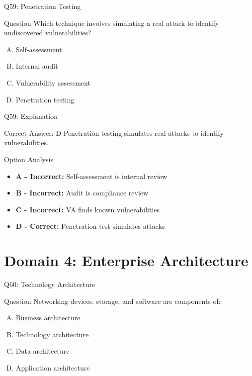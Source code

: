 \documentclass{beamer}
\begin{document}
	\begin{frame}{Q59: Penetration Testing}
		\begin{block}{Question}
			Which technique involves simulating a real attack to identify undiscovered vulnerabilities?
		\end{block}
		\begin{enumerate}[(A)]
			\item Self-assessment
			\item Internal audit
			\item Vulnerability assessment
			\item Penetration testing
		\end{enumerate}
	\end{frame}
	
	\begin{frame}{Q59: Explanation}
		\begin{block}{Correct Answer: D}
			Penetration testing simulates real attacks to identify vulnerabilities.
		\end{block}
		\begin{block}{Option Analysis}
			\begin{itemize}
				\item \textbf{A - Incorrect:} Self-assessment is internal review
				\item \textbf{B - Incorrect:} Audit is compliance review
				\item \textbf{C - Incorrect:} VA finds known vulnerabilities
				\item \textbf{D - Correct:} Penetration test simulates attacks
			\end{itemize}
		\end{block}
	\end{frame}
	
	
	\section{Domain 4: Enterprise Architecture}
	
	\begin{frame}{Q60: Technology Architecture}
		\begin{block}{Question}
			Networking devices, storage, and software are components of:
		\end{block}
		\begin{enumerate}[(A)]
			\item Business architecture
			\item Technology architecture
			\item Data architecture
			\item Application architecture
		\end{enumerate}
	\end{frame}
	
\end{document}
